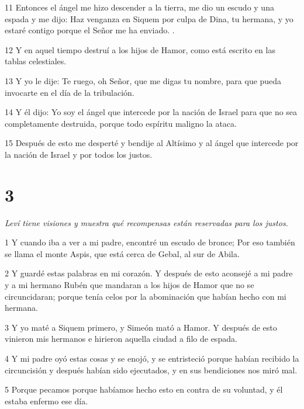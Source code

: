 \par 11 Entonces el ángel me hizo descender a la tierra, me dio un escudo y una espada y me dijo: Haz venganza en Siquem por culpa de Dina, tu hermana, y yo estaré contigo porque el Señor me ha enviado. .

\par 12 Y en aquel tiempo destruí a los hijos de Hamor, como está escrito en las tablas celestiales.

\par 13 Y yo le dije: Te ruego, oh Señor, que me digas tu nombre, para que pueda invocarte en el día de la tribulación.

\par 14 Y él dijo: Yo soy el ángel que intercede por la nación de Israel para que no sea completamente destruida, porque todo espíritu maligno la ataca.

\par 15 Después de esto me desperté y bendije al Altísimo y al ángel que intercede por la nación de Israel y por todos los justos.

\chapter{3}

\par \textit{Leví tiene visiones y muestra qué recompensas están reservadas para los justos.}

\par 1 Y cuando iba a ver a mi padre, encontré un escudo de bronce; Por eso también se llama el monte Aspis, que está cerca de Gebal, al sur de Abila.

\par 2 Y guardé estas palabras en mi corazón. Y después de esto aconsejé a mi padre y a mi hermano Rubén que mandaran a los hijos de Hamor que no se circuncidaran; porque tenía celos por la abominación que habían hecho con mi hermana.

\par 3 Y yo maté a Siquem primero, y Simeón mató a Hamor. Y después de esto vinieron mis hermanos e hirieron aquella ciudad a filo de espada.

\par 4 Y mi padre oyó estas cosas y se enojó, y se entristeció porque habían recibido la circuncisión y después habían sido ejecutados, y en sus bendiciones nos miró mal.

\par 5 Porque pecamos porque habíamos hecho esto en contra de su voluntad, y él estaba enfermo ese día.

